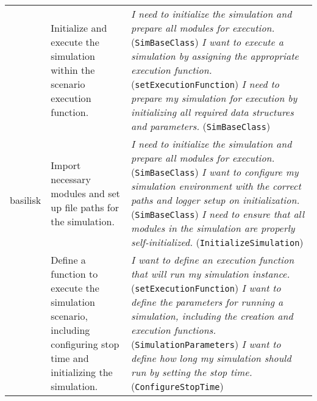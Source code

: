 \begin{longtable}{p{3cm}p{6cm}p{6cm}}
\midrule
\multirow{3}{*}{basilisk} & Initialize and execute the simulation within the scenario execution function. & \textit{I need to initialize the simulation and prepare all modules for execution.} (\texttt{SimBaseClass}) \newline \textit{I want to execute a simulation by assigning the appropriate execution function.} (\texttt{setExecutionFunction}) \newline \textit{I need to prepare my simulation for execution by initializing all required data structures and parameters.} (\texttt{SimBaseClass}) \\
\cmidrule(l){2-3}
& Import necessary modules and set up file paths for the simulation. & \textit{I need to initialize the simulation and prepare all modules for execution.} (\texttt{SimBaseClass}) \newline \textit{I want to configure my simulation environment with the correct paths and logger setup on initialization.} (\texttt{SimBaseClass}) \newline \textit{I need to ensure that all modules in the simulation are properly self-initialized.} (\texttt{InitializeSimulation}) \\
\cmidrule(l){2-3}
& Define a function to execute the simulation scenario, including configuring stop time and initializing the simulation. & \textit{I want to define an execution function that will run my simulation instance.} (\texttt{setExecutionFunction}) \newline \textit{I want to define the parameters for running a simulation, including the creation and execution functions.} (\texttt{SimulationParameters}) \newline \textit{I want to define how long my simulation should run by setting the stop time.} (\texttt{ConfigureStopTime}) \\

\end{longtable}
